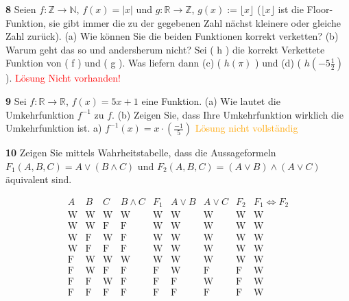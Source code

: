 \documentclass[11pt]{article}
\begin{document}
    \textbf{8} Seien \( f : \mathbb{Z} \rightarrow \mathbb{N} \), \( f(x) = |x| \) und \( g : \mathbb{R} \rightarrow \mathbb{Z} \), \( g(x) := \lfloor x \rfloor \) (\(\lfloor x \rfloor\) ist die Floor-Funktion, sie gibt immer die zu der gegebenen Zahl nächst kleinere oder gleiche Zahl zurück).
    (a) Wie können Sie die beiden Funktionen korrekt verketten? (b) Warum geht das so und andersherum nicht?
    Sei ( h ) die korrekt Verkettete Funktion von ( f ) und ( g ). Was liefern dann (c) ( $h(\pi)$ ) und (d) ( $h(-5\frac{1}{2})$ ).\newline
    \textcolor{red}{Lösung Nicht vorhanden!}\newline

    \textbf{9} Sei \( f : \mathbb{R} \rightarrow \mathbb{R} \), \( f(x) = 5x + 1 \) eine Funktion. (a) Wie lautet die Umkehrfunktion $f^{-1}$ zu $f$. (b) Zeigen Sie, dass Ihre Umkehrfunktion wirklich die Umkehrfunktion ist.\newline
    a) $f^{-1}(x) = x \cdot (\frac{-1}{5})$\newline
    \textcolor{orange}{Lösung nicht vollständig}\newline

    \textbf{10} Zeigen Sie mittels Wahrheitstabelle, dass die Aussageformeln \(F_1(A,B,C) = A \lor (B \land C)\) und \(F_2(A,B,C) = (A \lor B) \land (A \lor C)\) äquivalent sind.

\[
    \begin{array}{ccc|c|c|c|c|c|c|c}
        A & B & C & B \land C & F_1 & A \lor B & A \lor C & F_2 & F_1 \Leftrightarrow F_2 \\
        \hline
        \text{W} & \text{W} & \text{W} & \text{W} & \text{W} & \text{W} & \text{W} & \text{W} & \text{W} \\
        \text{W} & \text{W} & \text{F} & \text{F} & \text{W} & \text{W} & \text{W} & \text{W} & \text{W} \\
        \text{W} & \text{F} & \text{W} & \text{F} & \text{W} & \text{W} & \text{W} & \text{W} & \text{W} \\
        \text{W} & \text{F} & \text{F} & \text{F} & \text{W} & \text{W} & \text{W} & \text{W} & \text{W} \\
        \text{F} & \text{W} & \text{W} & \text{W} & \text{W} & \text{W} & \text{W} & \text{W} & \text{W} \\
        \text{F} & \text{W} & \text{F} & \text{F} & \text{F} & \text{W} & \text{F} & \text{F} & \text{W} \\
        \text{F} & \text{F} & \text{W} & \text{F} & \text{F} & \text{F} & \text{W} & \text{F} & \text{W} \\
        \text{F} & \text{F} & \text{F} & \text{F} & \text{F} & \text{F} & \text{F} & \text{F} & \text{W} \\
    \end{array}
\]
\end{document}
